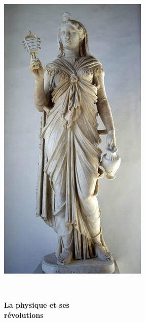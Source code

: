 \begin{titlepage}
%

\begin{center}
\includegraphics[scale=0.40]{./presentation/anubis}
\end{center}

\textsc{\Large }\\[0.5cm]

\HRule

\begin{center}
{\huge \bfseries  La physique et ses\\
révolutions\\[0.4cm] }
\end{center}

\HRule \\[1.5cm]



\end{titlepage}
